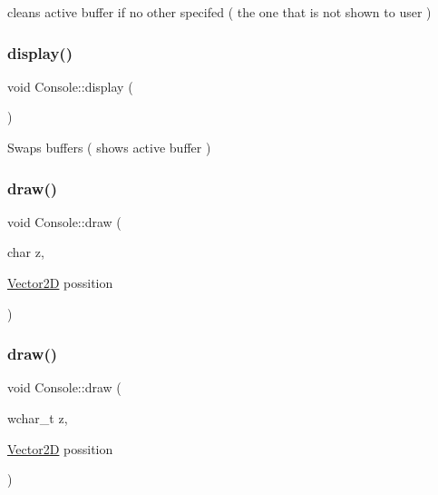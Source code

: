 cleans active buffer if no other specifed ( the one that is not shown to user ) 

\mbox{\label{classsc_1_1_console_aa392bbf2aeecd5e86a4e624bcf9b087a}} 
\subsubsection{\texorpdfstring{display()}{display()}}
{\footnotesize\ttfamily void Console\+::display (\begin{DoxyParamCaption}{ }\end{DoxyParamCaption})}



Swaps buffers ( shows active buffer ) 

\mbox{\label{classsc_1_1_console_a40d14517dcebf7f4ded1656efdbf5bcf}} 
\subsubsection{\texorpdfstring{draw()}{draw()}\hspace{0.1cm}{\footnotesize\ttfamily [1/8]}}
{\footnotesize\ttfamily void Console\+::draw (\begin{DoxyParamCaption}\item[{char}]{z,  }\item[{\mbox{\hyperlink{classsc_1_1_vector2_d}{Vector2D}}}]{possition }\end{DoxyParamCaption})}

\mbox{\label{classsc_1_1_console_a86c67142b3b25386f0a2333e80db62d3}} 
\subsubsection{\texorpdfstring{draw()}{draw()}\hspace{0.1cm}{\footnotesize\ttfamily [2/8]}}
{\footnotesize\ttfamily void Console\+::draw (\begin{DoxyParamCaption}\item[{wchar\+\_\+t}]{z,  }\item[{\mbox{\hyperlink{classsc_1_1_vector2_d}{Vector2D}}}]{possition }\end{DoxyParamCaption})}

